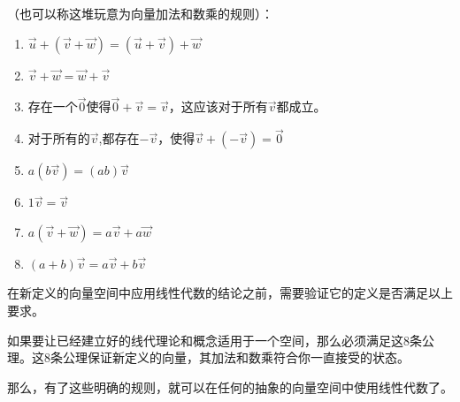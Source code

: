 \documentclass[UTF8]{ctexbook}
\begin{document}
{{{{（也可以称这堆玩意为向量加法和数乘的规则）：
\begin{enumerate}
  \item $\vec{u} + (\vec{v} + \vec{w}) = (\vec{u} + \vec{v}) + \vec{w}$
  \item $\vec{v} + \vec{w} = \vec{w} + \vec{v}$
  \item 存在一个$\vec{0}$使得$\vec{0} + \vec{v} = \vec{v}$，这应该对于所有$\vec{v}$都成立。
  \item 对于所有的$\vec{v}$,都存在$-\vec{v}$，使得$\vec{v} + (-\vec{v}) = \vec{0}$
  \item $a(b\vec{v}) = (ab)\vec{v}$
  \item $1\vec{v} = \vec{v}$
  \item $a(\vec{v} + \vec{w}) = a\vec{v} + a\vec{w}$
  \item $(a + b)\vec{v} = a\vec{v} + b\vec{v}$
\end{enumerate}

在新定义的向量空间中应用线性代数的结论之前，需要验证它的定义是否满足以上要求。

如果要让已经建立好的线代理论和概念适用于一个空间，那么必须满足这8条公理。这8条公理保证新定义的向量，其加法和数乘符合你一直接受的状态。

那么，有了这些明确的规则，就可以在任何{}的抽象的向量空间中使用线性代数了。
}%

}%

}%

}%
\end{document}
